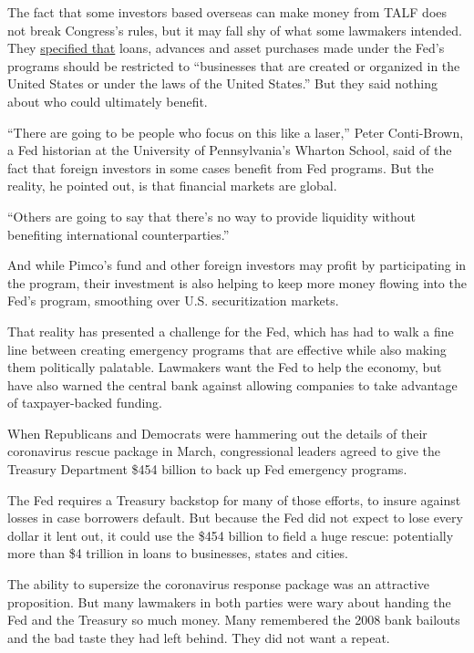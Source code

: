 The fact that some investors based overseas can make money from TALF
does not break Congress's rules, but it may fall shy of what some
lawmakers intended. They
\href{https://www.govinfo.gov/content/pkg/BILLS-116hr748enr/pdf/BILLS-116hr748enr.pdf}{specified
that} loans, advances and asset purchases made under the Fed's programs
should be restricted to ``businesses that are created or organized in
the United States or under the laws of the United States.'' But they
said nothing about who could ultimately benefit.

``There are going to be people who focus on this like a laser,'' Peter
Conti-Brown, a Fed historian at the University of Pennsylvania's Wharton
School, said of the fact that foreign investors in some cases benefit
from Fed programs. But the reality, he pointed out, is that financial
markets are global.

``Others are going to say that there's no way to provide liquidity
without benefiting international counterparties.''

And while Pimco's fund and other foreign investors may profit by
participating in the program, their investment is also helping to keep
more money flowing into the Fed's program, smoothing over U.S.
securitization markets.

That reality has presented a challenge for the Fed, which has had to
walk a fine line between creating emergency programs that are effective
while also making them politically palatable. Lawmakers want the Fed to
help the economy, but have also warned the central bank against allowing
companies to take advantage of taxpayer-backed funding.

When Republicans and Democrats were hammering out the details of their
coronavirus rescue package in March, congressional leaders agreed to
give the Treasury Department \$454 billion to back up Fed emergency
programs.

The Fed requires a Treasury backstop for many of those efforts, to
insure against losses in case borrowers default. But because the Fed did
not expect to lose every dollar it lent out, it could use the \$454
billion to field a huge rescue: potentially more than \$4 trillion in
loans to businesses, states and cities.

The ability to supersize the coronavirus response package was an
attractive proposition. But many lawmakers in both parties were wary
about handing the Fed and the Treasury so much money. Many remembered
the 2008 bank bailouts and the bad taste they had left behind. They did
not want a repeat.

